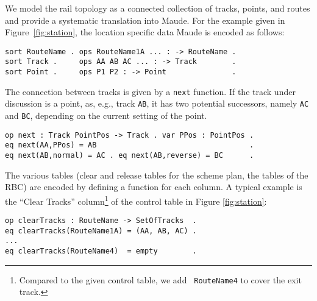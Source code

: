 We model the rail topology as a connected collection of tracks,
points, and routes and provide a systematic translation into
Maude. For the example given in Figure~\ref{fig:station}, the location
specific data Maude is encoded as follows:
%
\begin{lstlisting}[columns=fixed]
sort RouteName . ops RouteName1A ... : -> RouteName .
sort Track .     ops AA AB AC ... : -> Track        .
sort Point .     ops P1 P2 : -> Point               . 
\end{lstlisting}
%
The connection between tracks is given by a \verb|next| function. If
the track under discussion is a point, as, e.g., track \verb|AB|, it
has two potential successors, namely \verb|AC| and
\verb|BC|, depending on the current setting of the point.
%
\begin{lstlisting}[columns=fixed]
op next : Track PointPos -> Track . var PPos : PointPos .
eq next(AA,PPos) = AB                                   .
eq next(AB,normal) = AC . eq next(AB,reverse) = BC      .
\end{lstlisting}

The various tables (clear and release tables for the scheme plan, the
tables of the RBC) are encoded by defining a function for each
column. A typical example is the ``Clear Tracks''
column\footnote{Compared to the given control table, we add {\tt
RouteName4} to cover the exit track.} of the control table in
Figure \ref{fig:station}:
%
\begin{lstlisting}[columns=fixed]
op clearTracks : RouteName -> SetOfTracks  .
eq clearTracks(RouteName1A) = (AA, AB, AC) . 
...
eq clearTracks(RouteName4)  = empty        .
\end{lstlisting}
